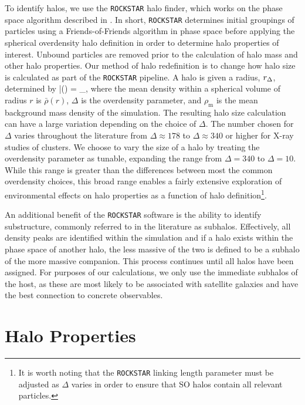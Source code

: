 \documentclass[usenatbib]{mnras}
\begin{document}
To identify halos, we use the {\tt ROCKSTAR} halo finder, which works on the phase space algorithm described in
\citet*{behroozi_etal13a}. In short, {\tt ROCKSTAR} determines initial groupings of particles using a Friends-of-Friends algorithm 
in phase space before applying the spherical overdensity halo definition in order to determine halo properties of
interest. Unbound particles are removed prior to the calculation of halo mass and other halo properties. Our
method of halo redefinition is to change how halo size is calculated as part of the {\tt ROCKSTAR} pipeline. 
A halo is given a radius, $r_{\Delta}$, determined by
\beq
	\bar{\rho}(\Rdel) = \Delta \rho_{}, 
\eeq
where the mean density within a spherical volume of radius $r$ is $\bar{\rho}(r)$, $\Delta$ is the overdensity
parameter, and $\rho_{\mathrm{m}}$ is the mean background mass density of the simulation. The resulting
halo size calculation can have a large variation depending on the choice of $\Delta$. The number chosen for
$\Delta$ varies throughout the literature from $\Delta \approx 178$ to $\Delta \approx 340$ or higher for X-ray studies of 
clusters. We choose to vary the size of a halo by treating the overdensity parameter as tunable, expanding the range from 
$\Delta = 340$ to $\Delta = 10$. While this range is greater than the differences between most 
the common overdensity choices, this broad range enables a fairly extensive exploration of 
environmental effects on halo properties as a function of halo definition\footnote{It is worth noting that the 
{\tt ROCKSTAR} linking length parameter must be adjusted as $\Delta$ varies in order to ensure 
that SO halos contain all relevant particles.}.

An additional benefit of the {\tt ROCKSTAR} software is the ability to identify substructure, commonly referred to in the
literature as subhalos. Effectively, all density peaks are identified within the simulation and if a halo exists within the phase
space of another halo, the less massive of the two is defined to be a subhalo of the more massive companion. This process
continues until all halos have been assigned. For purposes of our calculations, we only use the immediate subhalos of the host,
as these are most likely to be associated with satellite galaxies and have the best connection to concrete observables.

\section{Halo Properties}
\label{section:haloprops}
\end{document}
